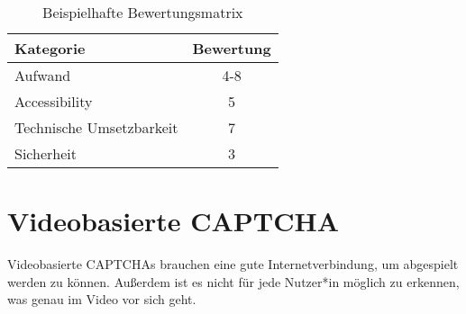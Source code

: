
\begin{table}[h!]
    \caption{Beispielhafte Bewertungsmatrix}
    \begin{center}
        \begin{tabular}{l|c}
            Kategorie                       & Bewertung \\\hline
            Aufwand                         & 4-8         \\
            Accessibility                   & 5        \\
            Technische Umsetzbarkeit        & 7         \\
            Sicherheit                      & 3         
        \end{tabular}
    \end{center}
\end{table}

\section*{Videobasierte CAPTCHA}
Videobasierte CAPTCHAs brauchen eine gute Internetverbindung, um abgespielt werden zu können.
Außerdem ist es nicht für jede Nutzer*in möglich zu erkennen, was genau im Video vor sich geht.

